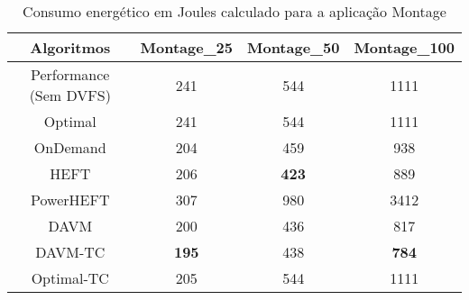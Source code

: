 \begin{table}
	\centering
    \begin{tabular}{c|ccc}
    \hline
    \textbf{Algoritmos}    & \textbf{Montage\_25} & \textbf{Montage\_50} & \textbf{Montage\_100} \\ \hline
    Performance (Sem DVFS) & 241        & 544        & 1111        \\
    \cite{guerout:energy_aware_simulation} Optimal      & 241        & 544        & 1111        \\
    \cite{guerout:energy_aware_simulation} OnDemand     & 204        & 459        & 938         \\
    HEFT                   & 206        & \textbf{423}        & 889         \\
    PowerHEFT              & 307        & 980        & 3412        \\
    DAVM                   & 200        & 436        & 817         \\
    DAVM-TC                & \textbf{195}        & 438        & \textbf{784}         \\
    Optimal-TC             & 205        & 544        & 1111        \\ \hline
    \end{tabular}
    \caption{Consumo energético em Joules calculado para a aplicação Montage}
    \label{tab:montage_energia}
\end{table}

